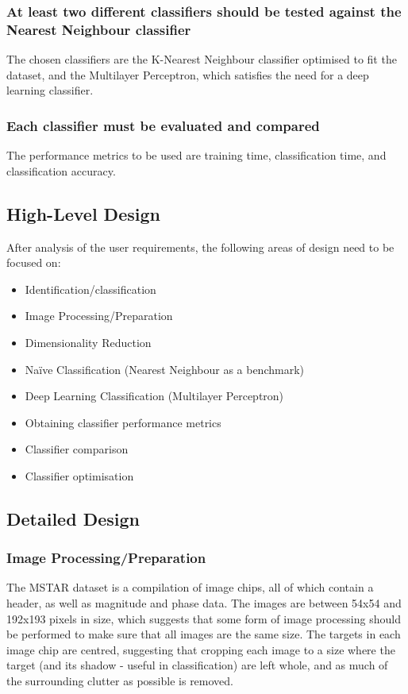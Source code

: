 \subsubsection{At least two different classifiers should be tested against the Nearest Neighbour classifier}
The chosen classifiers are the K-Nearest Neighbour classifier optimised to fit the dataset, and the Multilayer Perceptron, which satisfies the need for a deep learning classifier.

\subsubsection{Each classifier must be evaluated and compared}
The performance metrics to be used  are training time, classification time, and classification accuracy.

\subsection{High-Level Design}
After analysis of the user requirements, the following areas of design need to be focused on:

\begin{itemize}
	\item Identification/classification
	\item Image Processing/Preparation
	\item Dimensionality Reduction
	\item Na{\"i}ve Classification (Nearest Neighbour as a benchmark)
	\item Deep Learning Classification (Multilayer Perceptron)
	\item Obtaining classifier performance metrics
	\item Classifier comparison
	\item Classifier optimisation
\end{itemize}



\subsection{Detailed Design}
\subsubsection{Image Processing/Preparation}\label{sec:cropping}
The MSTAR dataset is a compilation of image chips, all of which contain a header, as well as magnitude and phase data. The images are between 54x54 and 192x193 pixels in size, which suggests that some form of image processing should be performed to make sure that all images are the same size. The targets in each image chip are centred, suggesting that cropping each image to a size where the target (and its shadow - useful in classification) are left whole, and as much of the surrounding clutter as possible is removed.

